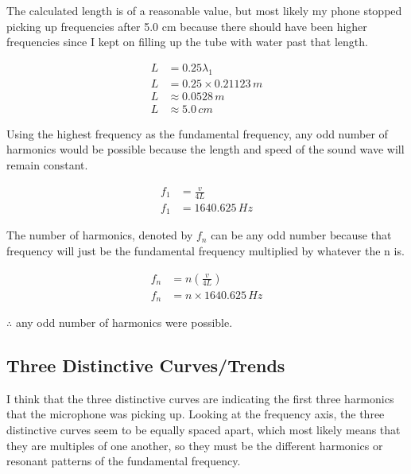 \documentclass[12pt]{article}
\numberwithin{equation}{section}
\begin{document}
The calculated length is of a reasonable value, but most likely my phone stopped picking up frequencies after 5.0 cm because there should have been higher frequencies since I kept on filling up the tube with water past that length.

\begin{align}
L&=0.25\lambda_{1}\\
L&=0.25\times0.21123\,m\\
L&\approx0.0528\,m\\
L&\approx5.0\,cm
\end{align}

Using the highest frequency as the fundamental frequency, any odd number of harmonics would be possible because the length and speed of the sound wave will remain constant.

\begin{align}
f_{1}&=\frac{v}{4L}\\
f_{1}&=1640.625\,Hz
\end{align}

The number of harmonics, denoted by $f_{n}$ can be any odd number because that frequency will just be the fundamental frequency multiplied by whatever the n is.

\begin{align}
f_{n}&=n\left(\frac{v}{4L}\right)\\
f_{n}&=n\times1640.625\,Hz
\end{align}

$\therefore$ any odd number of harmonics were possible.

\subsection{Three Distinctive Curves/Trends}

I think that the three distinctive curves are indicating the first three harmonics that the microphone was picking up. Looking at the frequency axis, the three distinctive curves seem to be equally spaced apart, which most likely means that they are multiples of one another, so they must be the different harmonics or resonant patterns of the fundamental frequency.
\end{document}
